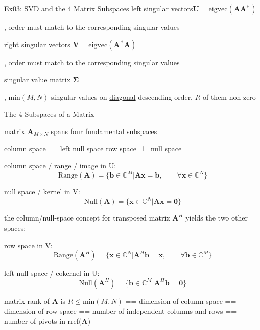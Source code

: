 \documentclass[mathserif, aspectratio=1610]{intbeamer}
\begin{document}
\begin{frame}{Ex03: SVD and the 4 Matrix Subspaces}
left singular vectors\quad$\bm{U} = \mathrm{eigvec}(\bm{A}\bm{A}^\mathrm{H})$
\begin{footnotesize}, order must match to the corresponding singular values\end{footnotesize}

right singular vectors $\bm{V} = \mathrm{eigvec}(\bm{A}^\mathrm{H}\bm{A})$
\begin{footnotesize}, order must match to the corresponding singular values\end{footnotesize}

singular value matrix $\bm{\Sigma}$
\begin{footnotesize}, $\text{min}(M,N)$ singular values on \underline{diagonal} descending order, $R$ of them non-zero
\end{footnotesize}
\end{frame}






\begin{frame}{The 4 Subspaces of a Matrix}

matrix $\bm{A}_{M \times N}$ spans four fundamental subspaces

\hspace{4.25cm}
\textcolor{C0}{column space} $\perp$ \textcolor{C4}{left null space}
\hspace{0.75cm}
\textcolor{C2}{row space} $\perp$ \textcolor{C1}{null space}

\textcolor{C0}{column space / range / image in U:} $$\text{Range}(\bm{A}) = \{\bm{b}\in\mathbb{C}^M | \bm{A} \bm{x} = \bm{b},\qquad\forall \bm{x}\in\mathbb{C}^N\}$$

\textcolor{C1}{null space / kernel in V:} $$\text{Null}(\bm{A}) = \{\bm{x}\in\mathbb{C}^N | \bm{A} \bm{x} = \bm{0}\}$$

the column/null-space concept for transposed matrix $\bm{A}^H$ yields the two other spaces:

\textcolor{C2}{row space in V:} $$\text{Range}(\bm{A}^H) = \{\bm{x}\in\mathbb{C}^N | \bm{A}^H \bm{b} = \bm{x},\qquad\forall \bm{b}\in\mathbb{C}^M\}$$

\textcolor{C4}{left null space / cokernel in U:} $$\text{Null}(\bm{A}^H) = \{\bm{b}\in\mathbb{C}^M | \bm{A}^H \bm{b} = \bm{0}\}$$

matrix rank of $\bm{A}$ is $R\leq \text{min}(M,N)$ == dimension of column space == dimension of row space == number of independent columns and rows
== number of pivots in rref($\bm{A}$)

\end{frame}
\end{document}
